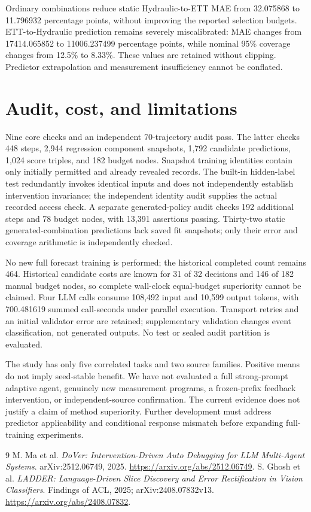 \documentclass[10pt]{article}
\begin{document}
Ordinary combinations reduce static Hydraulic-to-ETT MAE from 32.075868 to 11.796932 percentage points, without improving the reported selection budgets.
ETT-to-Hydraulic prediction remains severely miscalibrated: MAE changes from 17414.065852 to 11006.237499 percentage points, while nominal 95\% coverage changes from 12.5\% to 8.33\%.
These values are retained without clipping.
Predictor extrapolation and measurement insufficiency cannot be conflated.

\section{Audit, cost, and limitations}
Nine core checks and an independent 70-trajectory audit pass.
The latter checks 448 steps, 2,944 regression component snapshots, 1,792 candidate predictions, 1,024 score triples, and 182 budget nodes.
Snapshot training identities contain only initially permitted and already revealed records.
The built-in hidden-label test redundantly invokes identical inputs and does not independently establish intervention invariance; the independent identity audit supplies the actual recorded access check.
A separate generated-policy audit checks 192 additional steps and 78 budget nodes, with 13,391 assertions passing. Thirty-two static generated-combination predictions lack saved fit snapshots; only their error and coverage arithmetic is independently checked.

No new full forecast training is performed; the historical completed count remains 464.
Historical candidate costs are known for 31 of 32 decisions and 146 of 182 manual budget nodes, so complete wall-clock equal-budget superiority cannot be claimed.
Four LLM calls consume 108,492 input and 10,599 output tokens, with 700.481619 summed call-seconds under parallel execution.
Transport retries and an initial validator error are retained; supplementary validation changes event classification, not generated outputs.
No test or sealed audit partition is evaluated.

The study has only five correlated tasks and two source families.
Positive means do not imply seed-stable benefit.
We have not evaluated a full strong-prompt adaptive agent, genuinely new measurement programs, a frozen-prefix feedback intervention, or independent-source confirmation.
The current evidence does not justify a claim of method superiority.
Further development must address predictor applicability and conditional response mismatch before expanding full-training experiments.

\begin{thebibliography}{9}
M. Ma et al.
\emph{DoVer: Intervention-Driven Auto Debugging for LLM Multi-Agent Systems}.
arXiv:2512.06749, 2025.
\url{https://arxiv.org/abs/2512.06749}.
S. Ghosh et al.
\emph{LADDER: Language-Driven Slice Discovery and Error Rectification in Vision Classifiers}.
Findings of ACL, 2025; arXiv:2408.07832v13.
\url{https://arxiv.org/abs/2408.07832}.
\end{thebibliography}
\end{document}
